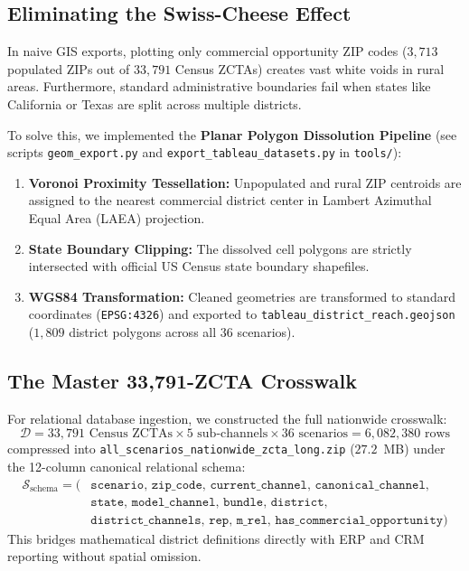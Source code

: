 \documentclass[11pt,a4paper]{article}
\theoremstyle{plain}
\theoremstyle{definition}
\begin{document}
\subsection{Eliminating the Swiss-Cheese Effect}
In naive GIS exports, plotting only commercial opportunity ZIP codes ($3,713$ populated ZIPs out of $33,791$ Census ZCTAs) creates vast white voids in rural areas. Furthermore, standard administrative boundaries fail when states like California or Texas are split across multiple districts.

To solve this, we implemented the \textbf{Planar Polygon Dissolution Pipeline} (see scripts \texttt{geom\_export.py} and \texttt{export\_tableau\_datasets.py} in \texttt{tools/}):
\begin{enumerate}[leftmargin=1.5em]
    \item \textbf{Voronoi Proximity Tessellation:} Unpopulated and rural ZIP centroids are assigned to the nearest commercial district center in Lambert Azimuthal Equal Area (LAEA) projection.
    \item \textbf{State Boundary Clipping:} The dissolved cell polygons are strictly intersected with official US Census state boundary shapefiles.
    \item \textbf{WGS84 Transformation:} Cleaned geometries are transformed to standard coordinates (\texttt{EPSG:4326}) and exported to \texttt{tableau\_district\_reach.geojson} ($1,809$ district polygons across all 36 scenarios).
\end{enumerate}

\subsection{The Master 33,791-ZCTA Crosswalk}
For relational database ingestion, we constructed the full nationwide crosswalk:
\begin{equation}
\mathcal{D} = 33,791 \text{ Census ZCTAs} \times 5 \text{ sub-channels} \times 36 \text{ scenarios} = 6,082,380 \text{ rows}
\end{equation}
compressed into \texttt{all\_scenarios\_nationwide\_zcta\_long.zip} ($27.2$~MB) under the 12-column canonical relational schema:
\begin{align*}
\mathcal{S}_{\text{schema}} = \big( & \texttt{scenario},\, \texttt{zip\_code},\, \texttt{current\_channel},\, \texttt{canonical\_channel}, \\
& \texttt{state},\, \texttt{model\_channel},\, \texttt{bundle},\, \texttt{district}, \\
& \texttt{district\_channels},\, \texttt{rep},\, \texttt{m\_rel},\, \texttt{has\_commercial\_opportunity} \big)
\end{align*}
This bridges mathematical district definitions directly with ERP and CRM reporting without spatial omission.
\end{document}
